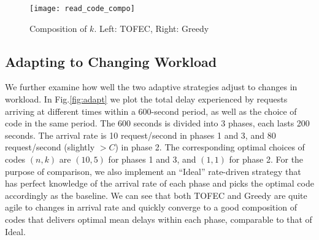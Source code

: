 \documentclass[journal]{IEEEtran}
\newcommand{\comment}[1]{}
\newcommand{\ourproposal}{TOFEC\xspace}
\newcommand{\CapFull}{C}
\newcommand{\onewidth}{0.74\columnwidth}
\newcommand{\threewidth}{0.3\textwidth}
\begin{document}
\begin{figure}[t]
\centering
\texttt{[image: read\_code\_compo]}
\caption{Composition of $k$. Left: \ourproposal, Right: Greedy}
\label{fig:read:composition}
\end{figure}



\begin{figure*}[!t]
\centering
\hfill
\hfill
\caption{Adaptation to changing workload}
\label{fig:adapt}
\end{figure*}

\comment{
\begin{figure}[!t]
\centering
\texttt{[image: changeArrival]}
\caption{Adaptation to changing workload}
\label{fig:read:changeArrival}
\end{figure}
}

\subsection{Adapting to Changing Workload}
We further examine how well the two adaptive strategies adjust to changes in workload. 
In Fig.\ref{fig:adapt} we plot the total delay experienced by requests arriving at different times within a 600-second period, as well as the choice of code in the same period. The 600 seconds is divided into 3 phases, each lasts 200 seconds.
The arrival rate is 10 request/second in phases 1 and 3, and 80 request/second (slightly $>\CapFull$) in phase 2. The corresponding optimal choices of codes $(n,k)$ are $(10,5)$ for phases 1 and 3, and $(1,1)$ for phase 2. 
For the purpose of comparison, we also implement an ``Ideal'' rate-driven strategy that has perfect knowledge of the arrival rate of each phase and picks the optimal code accordingly as the baseline.
We can see that both \ourproposal and Greedy are quite agile to changes in arrival rate and quickly converge to a good composition of codes that delivers optimal mean delays within each phase,  comparable to that of Ideal.
\end{document}
